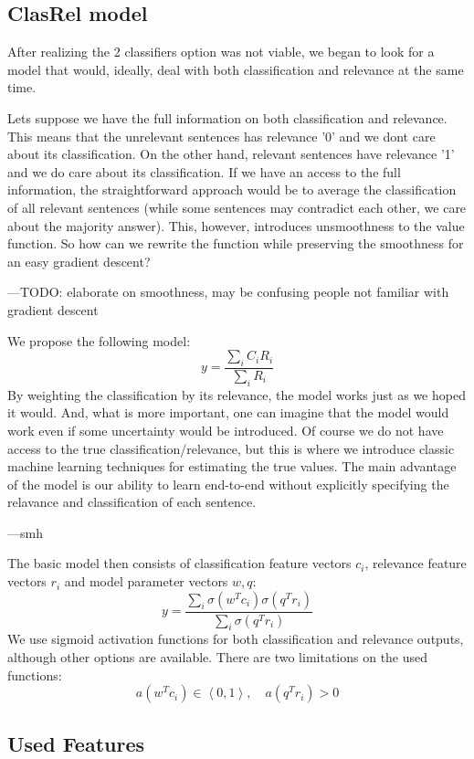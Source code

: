 \documentclass[11pt,a4paper]{article}
\begin{document}
\subsection{ClasRel model}
After realizing the 2 classifiers option was not viable, we began to look for a model that would, ideally, deal with both classification and relevance at the same time.

Lets suppose we have the full information on both classification and relevance. This means that the unrelevant sentences has relevance '0' and we dont care about its classification. On the other hand, relevant sentences have relevance '1' and we do care about its classification. If we have an access to the full information, the straightforward approach would be to average the classification of all relevant sentences (while some sentences may contradict each other, we care about the majority answer). This, however, introduces unsmoothness to the value function. So how can we rewrite the function while preserving the smoothness for an easy gradient descent?

---TODO: elaborate on smoothness, may be confusing people not familiar with gradient descent

We propose the following model:\\

\[ y  = \dfrac{\sum_i C_iR_i}{\sum_i R_i}
\]
By weighting the classification by its relevance, the model works just as we hoped it would. And, what is more important, one can imagine that the model would work even if some uncertainty would be introduced. Of course we do not have access to the true classification/relevance, but this is where we introduce classic machine learning techniques for estimating the true values. The main advantage of the model is our ability to learn end-to-end without explicitly specifying the relavance and classification of each sentence. 

---smh

The basic model then consists of classification feature vectors $c_i$, relevance feature vectors $r_i$ and model parameter vectors $w, q$:
\[ y  = \dfrac{\sum_i \sigma(w^Tc_i)\sigma(q^Tr_i)}{\sum_i \sigma(q^Tr_i)}
\]
We use sigmoid activation functions for both classification and relevance outputs, although other options are available. There are two limitations on the used functions:
$$a(w^Tc_i) \in  \left\langle 0,1\right\rangle , \quad a(q^Tr_i) > 0$$

\subsection{Used Features}
\end{document}
